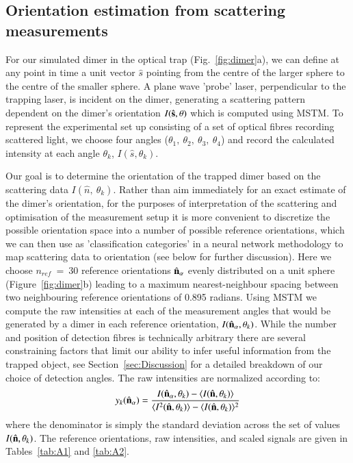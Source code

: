 \documentclass[final,  3p]{elsarticle}
\begin{document}
\subsection{Orientation estimation from scattering measurements}
\label{sec:Bayes}

For our simulated dimer in the optical trap (Fig.~\ref{fig:dimer}a), we can define at any point in time a unit vector $\hat{s}$ pointing from the centre of the larger sphere to the centre of the smaller sphere. A plane wave 'probe' laser, perpendicular to the trapping laser, is incident on the dimer, generating a scattering pattern  dependent on the dimer's orientation $I(\hat{\bf s}, \theta)$ which is computed using MSTM. To represent the experimental set up consisting of a set of optical fibres recording scattered light, we choose four angles  ($\theta_1, \ \theta_2, \ \theta_3, \ \theta_4$) and record the calculated intensity at each angle $\theta_k$, $I(\hat{s}, \theta_k)$. 

Our goal is to determine the orientation of the trapped dimer based on the scattering data $I(\hat{n}, \ \theta_k)$. Rather than aim immediately for an exact estimate of the dimer's orientation, for the purposes of interpretation of the scattering and optimisation of the measurement setup it is more convenient to discretize the possible orientation space into a number of possible reference orientations, which we can then use as 'classification categories' in a neural network methodology to map scattering data to orientation (see below for further discussion).  Here we choose $\textit{n}_{ref} \ = \ 30$ reference orientations $\hat{\bf n}_{\alpha}$  evenly distributed on a unit sphere \cite{Rey2006} (Figure~\ref{fig:dimer}b) leading to a maximum nearest-neighbour spacing between two neighbouring reference orientations of 0.895 radians. Using MSTM we compute the raw intensities at each of the measurement angles that would be generated by a dimer in each reference orientation, $I(\hat{\bf n}_{\alpha}, \theta_k)$. While the number and position of detection fibres is technically arbitrary there are several constraining factors that limit our ability to infer useful information from the trapped object, see Section~\ref{sec:Discussion} for a detailed breakdown of our choice of detection angles. The raw intensities are normalized according to:
\begin{align}
\label{eq:scale}
  y_k(\hat{\bf n}_\alpha)
  = 
  \frac{I(\hat{\bf n}_\alpha, \theta_k) - \langle I(\hat{\bf n},\theta_k) \rangle } 
  {\langle I^2(\hat{\bf n},\theta_k) \rangle -\langle I(\hat{\bf n}, \theta_k)\rangle^2}
\end{align}
where the denominator is simply the standard deviation across the set of values $I(\hat{\bf n}, \theta_k)$. The reference orientations, raw intensities, and scaled signals are given in Tables~\ref{tab:A1} and \ref{tab:A2}. 
\end{document}
